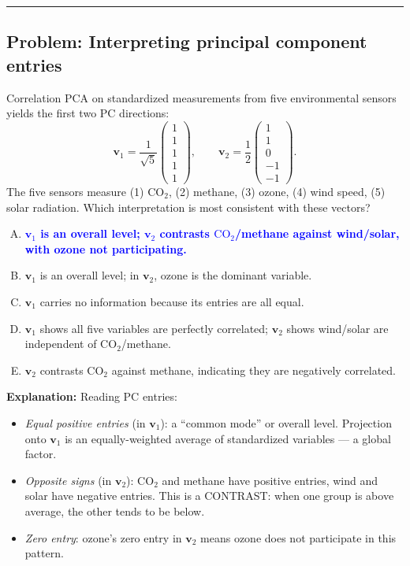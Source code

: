 \documentclass[12pt]{amsart}
\newcommand{\divider}{
  \vspace{-1em}
  \noindent
  \raisebox{-0.15ex}{\textbullet}%
  \hspace{0.5em}%
  \rule[0.5ex]{0.95\textwidth}{1.0pt}%
  \hspace{0.5em}%
  \raisebox{-0.15ex}{\textbullet}%
  \vspace{0em}
}
\begin{document}
\divider

\subsection*{Problem: Interpreting principal component entries}

Correlation PCA on standardized measurements from five environmental sensors
yields the first two PC directions:
$$\mathbf{v}_1 = \frac{1}{\sqrt{5}}\begin{pmatrix} 1 \\ 1 \\ 1 \\ 1 \\ 1 \end{pmatrix},
\qquad \mathbf{v}_2 = \frac{1}{2}\begin{pmatrix} 1 \\ 1 \\ 0 \\ -1 \\ -1 \end{pmatrix}.$$
The five sensors measure (1) $\mathrm{CO}_2$, (2) methane, (3) ozone, (4) wind speed, (5) solar radiation.
Which interpretation is most consistent with these vectors?

\begin{enumerate}[(A)]
\item \textcolor{blue}{\textbf{$\mathbf{v}_1$ is an overall level; $\mathbf{v}_2$ contrasts $\mathrm{CO}_2$/methane against wind/solar, with ozone not participating.}}
\item $\mathbf{v}_1$ is an overall level; in $\mathbf{v}_2$, ozone is the dominant variable.
\item $\mathbf{v}_1$ carries no information because its entries are all equal.
\item $\mathbf{v}_1$ shows all five variables are perfectly correlated; $\mathbf{v}_2$ shows wind/solar are independent of $\mathrm{CO}_2$/methane.
\item $\mathbf{v}_2$ contrasts $\mathrm{CO}_2$ against methane, indicating they are negatively correlated.
\end{enumerate}

\textbf{Explanation:}
Reading PC entries:
\begin{itemize}
\item \emph{Equal positive entries} (in $\mathbf{v}_1$): a ``common mode'' or
overall level. Projection onto $\mathbf{v}_1$ is an equally-weighted average of
standardized variables --- a global factor.
\item \emph{Opposite signs} (in $\mathbf{v}_2$): $\mathrm{CO}_2$ and methane have
positive entries, wind and solar have negative entries. This is a CONTRAST:
when one group is above average, the other tends to be below.
\item \emph{Zero entry}: ozone's zero entry in $\mathbf{v}_2$ means ozone does not
participate in this pattern.
\end{itemize}
\end{document}
